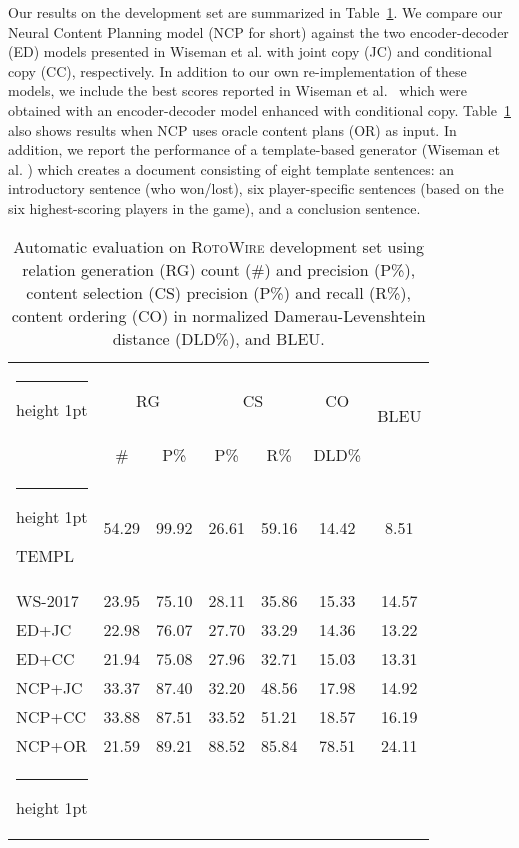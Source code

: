 \documentclass[letterpaper]{article} \usepackage{aaai19}  \usepackage{times}  \usepackage{helvet}  \usepackage{courier}  \usepackage{url}  \usepackage{graphicx}  \frenchspacing  \setlength{\pdfpagewidth}{8.5in}  \setlength{\pdfpageheight}{11in}  \graphicspath{ {images/} }
\makeatletter
\newcommand{\thickhline}{\noalign {\ifnum 0=`}\fi \hrule height 1pt
    \futurelet \reserved@a \@xhline
}
\makeatother
\begin{document}
Our results on the development set are summarized in
Table~\ref{generation-from-plan-dev}. We compare our Neural Content
Planning model (NCP for short) against the two encoder-decoder (ED)
models presented in Wiseman et al. 
with joint copy (JC) and conditional copy (CC), respectively. In
addition to our own re-implementation of these models, we include the
best scores reported in Wiseman et
al.~ which were obtained with an
encoder-decoder model enhanced with conditional copy.
Table~\ref{generation-from-plan-dev} also shows results when NCP uses
oracle content plans (OR) as input. In addition, we report the
performance of a template-based generator (Wiseman et
al. \citeyear{wiseman2017challenges}) which creates a document
consisting of eight template sentences: an introductory sentence (who
won/lost), six player-specific sentences (based on the six
highest-scoring players in the game), and a conclusion sentence.

\begin{table}[t]
\small
\centering
\begin{tabular}{@{~}l@{~}|@{~}c@{~~~}c@{~}|c@{~~~}c|c|@{~}c@{~} }
 \thickhline
 \multirow{2}{*}{Model} &\multicolumn{2}{c|}{RG} &\multicolumn{2}{c|}{CS} & CO & \multirow{2}{*}{BLEU}\\

 &\# & P\% & P\% & R\% & DLD\% & \\ \thickhline
TEMPL &54.29 &99.92 &26.61 &59.16 &14.42 &8.51  \\
WS-2017 & 23.95 & 75.10 & 28.11 & 35.86 & 15.33 & 14.57 \\
ED+JC & 22.98 & 76.07 & 27.70 & 33.29 & 14.36 & 13.22  \\ ED+CC & 21.94 & 75.08 &27.96 & 32.71 & 15.03 & 13.31 \\ NCP+JC  & 33.37 & 87.40 & 32.20 & 48.56 & 17.98 & 14.92 \\ NCP+CC &{33.88} & {87.51} & {33.52} & {51.21}
 &{18.57} & {16.19}\\ NCP+OR & 21.59 & 89.21 & 88.52 & 85.84 & 78.51 & 24.11\\
\thickhline
\end{tabular}
\caption{\label{generation-from-plan-dev} Automatic evaluation
  on  \textsc{RotoWire} development set using 
  relation generation (RG)  count (\#) and precision (P\%), content
  selection (CS) precision (P\%) and recall (R\%), content ordering (CO) in normalized
  Damerau-Levenshtein distance (DLD\%), and BLEU.}\end{table}
\end{document}
